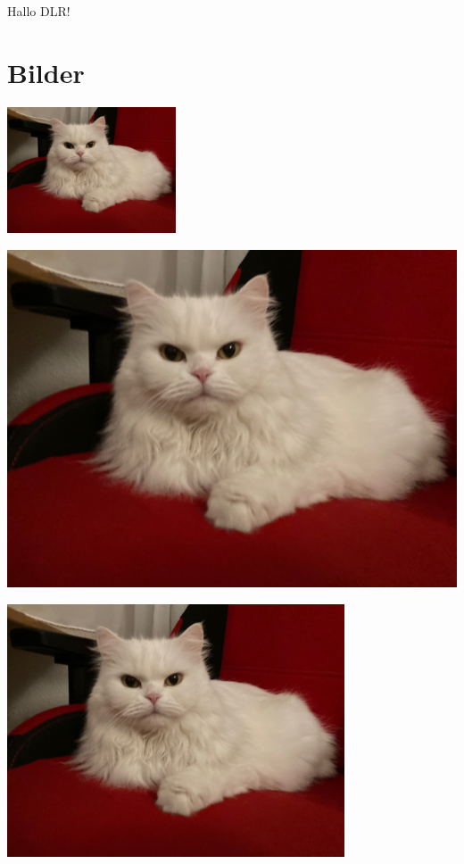 \documentclass[12pt,ngerman,parskip=half]{scrreprt} %
\begin{document}
\begin{center}
\Large Hallo DLR!
\end{center}

\chapter{Bilder}

\includegraphics[width=5cm]{Katze2.jpg}

\includegraphics[width=\textwidth]{Katze2.jpg}

\begin{center}
\includegraphics[width=0.75\textwidth]{Katze2.jpg}
\end{center}
\end{document}

